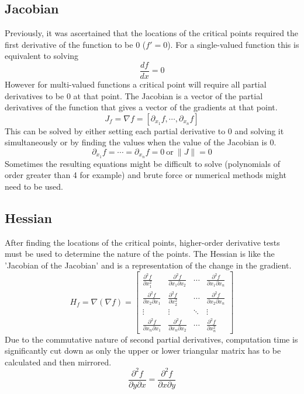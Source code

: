 \documentclass[10pt,a4paper]{report}
\begin{document}
			\subsection{Jacobian}
				Previously, it was ascertained that the locations of the critical points required the first derivative of the function to be 0 ($f' = 0$).
				For a single-valued function this is equivalent to solving \[\frac{df}{dx} = 0\]
				However for multi-valued functions a critical point will require all partial derivatives to be 0 at that point. The Jacobian \autocite{Jacobian} is
				a vector of the partial derivatives of the function that gives a vector of the gradients at that point.
				\begin{equation}
					J_f = \nabla f = [\partial_{x_1} f, \cdots, \partial_{x_n} f]
					\label{eq:jacobian}
				\end{equation}
				This can be solved by either setting each partial derivative to 0 and solving it simultaneously or by finding the values
				when the value of the Jacobian is 0. \[\partial_{x_1} f = \cdots = \partial_{x_n} f = 0 \ \textrm{or} \ \| J \| = 0 \]
				Sometimes the resulting equations might be difficult to solve (polynomials of order greater than 4 for example) and brute force or numerical methods
				might need to be used.
			\subsection{Hessian}
				After finding the locations of the critical points, higher-order derivative tests must be used to determine the nature of the points.
				The Hessian \autocite{Hessian} is like the 'Jacobian of the Jacobian' and is a representation of the change in the gradient.
				\begin{equation}
					H_f = \nabla(\nabla f) =
						\begin{bmatrix}
							\frac{\partial^2 f}{\partial x_{1}^{2}} & \frac{\partial^2 f}{\partial x_1 \partial x_2} &\cdots & \frac{\partial^2 f}{\partial x_1 \partial x_n}\\
							\frac{\partial^2 f}{\partial x_2 \partial x_1} & \frac{\partial^2 f}{\partial x_{2}^{2}} & \cdots & \frac{\partial^2 f}{\partial x_2 \partial x_n}\\
							\vdots & \vdots  & \ddots & \vdots \\
							\frac{\partial^2 f}{\partial x_n \partial x_1} & \frac{\partial^2 f}{\partial x_n \partial x_2} & \cdots & \frac{\partial^2 f}{\partial x_{n}^{2}}
						\end{bmatrix}
					\label{eq:hessian}
				\end{equation}
				Due to the commutative nature of second partial derivatives, computation time is significantly cut down as only the upper or lower
				triangular matrix has to be calculated and then mirrored.
				\begin{equation}
					\frac{\partial^2 f}{\partial y \partial x} = \frac{\partial^2 f}{\partial x \partial y}
					\label{eq:symmetry}
				\end{equation}
\end{document}
